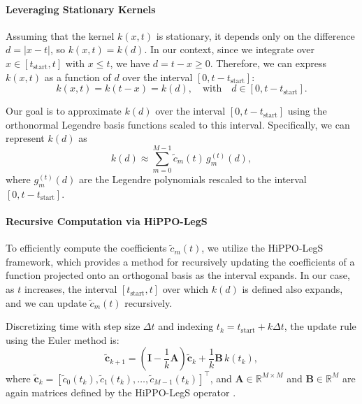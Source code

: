 \paragraph{Leveraging Stationary Kernels}

Assuming that the kernel \( k(x, t) \) is stationary, it depends only on the difference \( d = |x - t| \), so \( k(x, t) = k(d) \). In our context, since we integrate over \( x \in [t_{\text{start}}, t] \) with \( x \leq t \), we have \( d = t - x \geq 0 \). Therefore, we can express \( k(x, t) \) as a function of \( d \) over the interval \( [0, t - t_{\text{start}}] \):
\begin{equation}
    k(x, t) = k(t - x) = k(d), \quad \text{with} \quad d \in [0, t - t_{\text{start}}].
\end{equation}

Our goal is to approximate \( k(d) \) over the interval \( [0, t - t_{\text{start}}] \) using the orthonormal Legendre basis functions scaled to this interval. Specifically, we can represent \( k(d) \) as
\begin{equation}
    k(d) \approx \sum_{m=0}^{M-1} \tilde{c}_m(t) \, g_m^{(t)}(d),
\end{equation}
where \( g_m^{(t)}(d) \) are the Legendre polynomials rescaled to the interval \( [0, t - t_{\text{start}}] \).

\paragraph{Recursive Computation via HiPPO-LegS}

To efficiently compute the coefficients \( \tilde{c}_m(t) \), we utilize the HiPPO-LegS framework, which provides a method for recursively updating the coefficients of a function projected onto an orthogonal basis as the interval expands. In our case, as \( t \) increases, the interval \( [t_{\text{start}}, t] \) over which \( k(d) \) is defined also expands, and we can update \( \tilde{c}_m(t) \) recursively.

Discretizing time with step size \( \Delta t \) and indexing \( t_k = t_{\text{start}} + k \Delta t \), the update rule using the Euler method is:
\begin{equation}
    \tilde{\mathbf{c}}_{k+1} = \left( \mathbf{I} - \frac{1}{k} \mathbf{A} \right) \tilde{\mathbf{c}}_k + \frac{1}{k} \mathbf{B} \, k(t_k),
    \label{eq:hippo_coeff_update}
\end{equation}
where \( \tilde{\mathbf{c}}_k = \left[\tilde{c}_0(t_k), \tilde{c}_1(t_k), \ldots, \tilde{c}_{M-1}(t_k)\right]^\intercal \), and \( \mathbf{A} \in \mathbb{R}^{M \times M} \) and \( \mathbf{B} \in \mathbb{R}^M \) are again matrices defined by the HiPPO-LegS operator \citep{gu_hippo_2020}.

